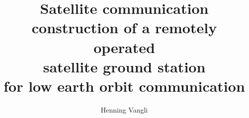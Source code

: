 

\author{Henning Vangli}
\title{Satellite communication\\ construction of a remotely operated\\
satellite ground station\\ for low earth orbit communication}


\maketitle
\tableofcontents


\begin{thebibliography}{99}

\end{thebibliography}


